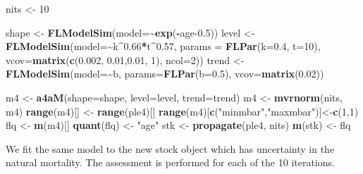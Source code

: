 \documentclass[
]{book}
\newenvironment{Shaded}{\begin{snugshade}}{\end{snugshade}}
\newcommand{\AttributeTok}[1]{\textcolor[rgb]{0.13,0.29,0.53}{#1}}
\newcommand{\DecValTok}[1]{\textcolor[rgb]{0.00,0.00,0.81}{#1}}
\newcommand{\FloatTok}[1]{\textcolor[rgb]{0.00,0.00,0.81}{#1}}
\newcommand{\FunctionTok}[1]{\textcolor[rgb]{0.13,0.29,0.53}{\textbf{#1}}}
\newcommand{\NormalTok}[1]{#1}
\newcommand{\OtherTok}[1]{\textcolor[rgb]{0.56,0.35,0.01}{#1}}
\newcommand{\SpecialCharTok}[1]{\textcolor[rgb]{0.81,0.36,0.00}{\textbf{#1}}}
\newcommand{\StringTok}[1]{\textcolor[rgb]{0.31,0.60,0.02}{#1}}
\begin{document}
\begin{Shaded}
\begin{Highlighting}[]
\NormalTok{nits }\OtherTok{\textless{}{-}} \DecValTok{10}

\NormalTok{shape }\OtherTok{\textless{}{-}} \FunctionTok{FLModelSim}\NormalTok{(}\AttributeTok{model=}\SpecialCharTok{\textasciitilde{}}\FunctionTok{exp}\NormalTok{(}\SpecialCharTok{{-}}\NormalTok{age}\FloatTok{{-}0.5}\NormalTok{))}
\NormalTok{level }\OtherTok{\textless{}{-}} \FunctionTok{FLModelSim}\NormalTok{(}\AttributeTok{model=}\SpecialCharTok{\textasciitilde{}}\NormalTok{k}\SpecialCharTok{\^{}}\FloatTok{0.66}\SpecialCharTok{*}\NormalTok{t}\SpecialCharTok{\^{}}\FloatTok{0.57}\NormalTok{, }\AttributeTok{params =} \FunctionTok{FLPar}\NormalTok{(}\AttributeTok{k=}\FloatTok{0.4}\NormalTok{, }\AttributeTok{t=}\DecValTok{10}\NormalTok{),}
                     \AttributeTok{vcov=}\FunctionTok{matrix}\NormalTok{(}\FunctionTok{c}\NormalTok{(}\FloatTok{0.002}\NormalTok{, }\FloatTok{0.01}\NormalTok{,}\FloatTok{0.01}\NormalTok{, }\DecValTok{1}\NormalTok{), }\AttributeTok{ncol=}\DecValTok{2}\NormalTok{))}
\NormalTok{trend }\OtherTok{\textless{}{-}} \FunctionTok{FLModelSim}\NormalTok{(}\AttributeTok{model=}\SpecialCharTok{\textasciitilde{}}\NormalTok{b, }\AttributeTok{params=}\FunctionTok{FLPar}\NormalTok{(}\AttributeTok{b=}\FloatTok{0.5}\NormalTok{), }\AttributeTok{vcov=}\FunctionTok{matrix}\NormalTok{(}\FloatTok{0.02}\NormalTok{))}

\NormalTok{m4 }\OtherTok{\textless{}{-}} \FunctionTok{a4aM}\NormalTok{(}\AttributeTok{shape=}\NormalTok{shape, }\AttributeTok{level=}\NormalTok{level, }\AttributeTok{trend=}\NormalTok{trend)}
\NormalTok{m4 }\OtherTok{\textless{}{-}} \FunctionTok{mvrnorm}\NormalTok{(nits, m4)}
\FunctionTok{range}\NormalTok{(m4)[] }\OtherTok{\textless{}{-}} \FunctionTok{range}\NormalTok{(ple4)[]}
\FunctionTok{range}\NormalTok{(m4)[}\FunctionTok{c}\NormalTok{(}\StringTok{"minmbar"}\NormalTok{,}\StringTok{"maxmbar"}\NormalTok{)]}\OtherTok{\textless{}{-}}\FunctionTok{c}\NormalTok{(}\DecValTok{1}\NormalTok{,}\DecValTok{1}\NormalTok{)}
\NormalTok{flq }\OtherTok{\textless{}{-}} \FunctionTok{m}\NormalTok{(m4)[]}
\FunctionTok{quant}\NormalTok{(flq) }\OtherTok{\textless{}{-}} \StringTok{"age"}
\NormalTok{stk }\OtherTok{\textless{}{-}} \FunctionTok{propagate}\NormalTok{(ple4, nits)}
\FunctionTok{m}\NormalTok{(stk) }\OtherTok{\textless{}{-}}\NormalTok{ flq}
\end{Highlighting}
\end{Shaded}

We fit the same model to the new stock object which has uncertainty in the natural mortality. The assessment is performed for each of the 10 iterations.
\end{document}
